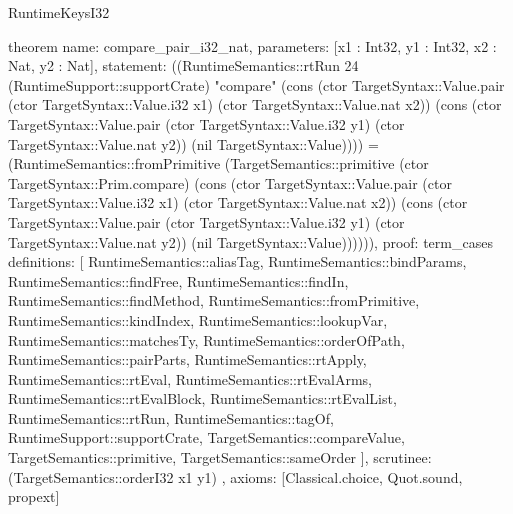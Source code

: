 \begin{lexlean}{RuntimeKeysI32}
\begin{semanticmodule}
theorem{
  name: compare_pair_i32_nat,
  parameters: [x1 : Int32, y1 : Int32, x2 : Nat, y2 : Nat],
  statement: ((RuntimeSemantics::rtRun 24 (RuntimeSupport::supportCrate) "compare" (cons (ctor TargetSyntax::Value.pair (ctor TargetSyntax::Value.i32 x1) (ctor TargetSyntax::Value.nat x2)) (cons (ctor TargetSyntax::Value.pair (ctor TargetSyntax::Value.i32 y1) (ctor TargetSyntax::Value.nat y2)) (nil TargetSyntax::Value)))) = (RuntimeSemantics::fromPrimitive (TargetSemantics::primitive (ctor TargetSyntax::Prim.compare) (cons (ctor TargetSyntax::Value.pair (ctor TargetSyntax::Value.i32 x1) (ctor TargetSyntax::Value.nat x2)) (cons (ctor TargetSyntax::Value.pair (ctor TargetSyntax::Value.i32 y1) (ctor TargetSyntax::Value.nat y2)) (nil TargetSyntax::Value)))))),
  proof: term_cases{
    definitions: [
      RuntimeSemantics::aliasTag,
      RuntimeSemantics::bindParams,
      RuntimeSemantics::findFree,
      RuntimeSemantics::findIn,
      RuntimeSemantics::findMethod,
      RuntimeSemantics::fromPrimitive,
      RuntimeSemantics::kindIndex,
      RuntimeSemantics::lookupVar,
      RuntimeSemantics::matchesTy,
      RuntimeSemantics::orderOfPath,
      RuntimeSemantics::pairParts,
      RuntimeSemantics::rtApply,
      RuntimeSemantics::rtEval,
      RuntimeSemantics::rtEvalArms,
      RuntimeSemantics::rtEvalBlock,
      RuntimeSemantics::rtEvalList,
      RuntimeSemantics::rtRun,
      RuntimeSemantics::tagOf,
      RuntimeSupport::supportCrate,
      TargetSemantics::compareValue,
      TargetSemantics::primitive,
      TargetSemantics::sameOrder
    ],
    scrutinee: (TargetSemantics::orderI32 x1 y1)
  },
  axioms: [Classical.choice, Quot.sound, propext]
}


\end{semanticmodule}
\end{lexlean}
